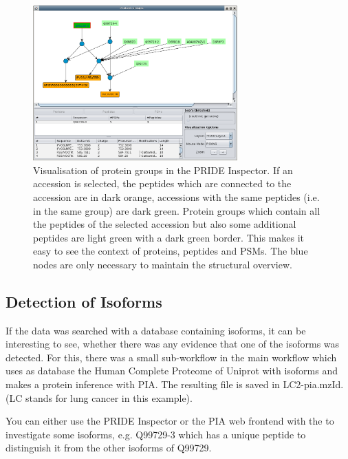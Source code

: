 \begin{figure}
\centering
\includegraphics[width=0.7\textwidth]{graphics/protein_inference/inference_isoforms}
\caption{Visualisation of protein groups in the PRIDE Inspector. If an accession is selected, the peptides which are connected to the accession are in dark orange, accessions with the same peptides (i.e. in the same group) are dark green. Protein groups which contain all the peptides of the selected accession but also some additional peptides are light green with a dark green border. This makes it easy to see the context of proteins, peptides and PSMs. The blue nodes are only necessary to maintain the structural overview.}
\label{fig:pride_inspector_protein_groups}
\end{figure}


\subsection{Detection of Isoforms}
If the data was searched with a database containing isoforms, it can be interesting to see, whether there was any evidence that one of the isoforms was detected. For this, there was a small sub-workflow in the main workflow which uses as database the Human Complete Proteome of Uniprot with isoforms and makes a protein inference with PIA. The resulting file is saved in LC2-pia.mzId. (LC stands for lung cancer in this example).

\begin{task}
    You can either use the PRIDE Inspector or the PIA web frontend with the  to investigate some isoforms, e.g. Q99729-3 which has a unique peptide to distinguish it from the other isoforms of Q99729.
\end{task}
